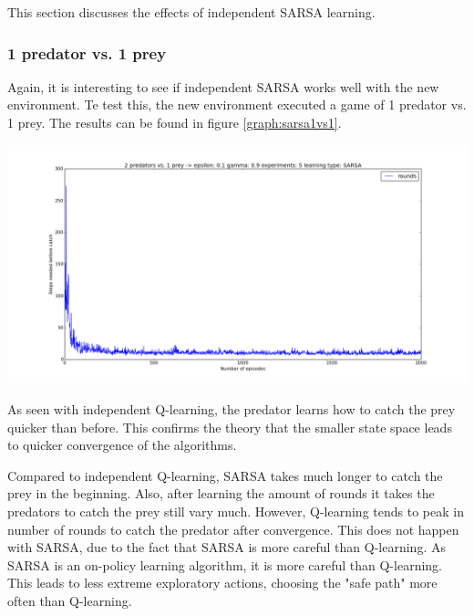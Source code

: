 This section discusses the effects of independent SARSA learning.
\subsubsection{1 predator vs. 1 prey}
Again, it is interesting to see if independent SARSA works well with the new environment. Te test this, the new environment executed a game of 1 predator vs. 1 prey. The results can be found in figure \ref{graph:sarsa1vs1}.

\begin{center}
	\includegraphics[scale=0.3]{1_predator_1_prey_SARSA}
	\label{graph:sarsa1vs1}
\end{center}

As seen with independent Q-learning, the predator learns how to catch the prey quicker than before. This confirms the theory that the smaller state space leads to quicker convergence of the algorithms. 

Compared to independent Q-learning, SARSA takes much longer to catch the prey in the beginning. Also, after learning the amount of rounds it takes the predators to catch the prey still vary much. However, Q-learning tends to peak in number of rounds to catch the predator after convergence. This does not happen with SARSA, due to the fact that SARSA is more careful than Q-learning. As SARSA is an on-policy learning algorithm, it is more careful than Q-learning. This leads to less extreme exploratory actions, choosing the "safe path" more often than Q-learning.

